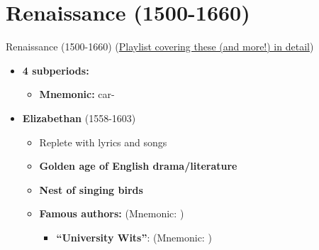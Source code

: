 \documentclass[
  12pt,
    progressbar=frametitle]{beamer}
\providecommand{\tightlist}{%
  \setlength{\itemsep}{0pt}\setlength{\parskip}{0pt}}
\begin{document}
\section{Renaissance (1500-1660)}
\begin{frame}[allowframebreaks]
{Renaissance (1500-1660)}
\scriptsize(\href{https://youtube.com/playlist?list=PL35b_WFpfhcbfCg0xUOjImc-eGDxu3Imf}
 {Playlist covering these (and more!) in detail})\normalsize\vspace{-2mm}

\begin{itemize}
\tightlist
\item
  \textbf{4 subperiods:}

  \begin{itemize}
  \tightlist
  \item
    \textbf{Mnemonic:} \footnotesize{}\;\normalsize
    car-\footnotesize{}\;\normalsize
  \end{itemize}
\item
  \textbf{Elizabethan} (1558-1603)

  \begin{itemize}
  \tightlist
  \item
    Replete with lyrics and songs
  \item
    \textbf{Golden age of English drama/literature}
  \item
    \textbf{Nest of singing birds}
  \item
    \textbf{Famous authors:} (Mnemonic: \footnotesize
    \footnotesize{}\;\normalsize\normalsize)

    \begin{itemize}
    \tightlist
    \item
      \textbf{``University Wits''}: (Mnemonic:
      \footnotesize{}\;\normalsize)


\end{itemize}
\end{itemize}
\end{itemize}
\end{frame}
\end{document}

